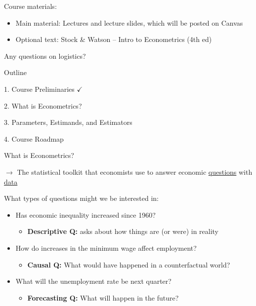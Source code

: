 \documentclass[11pt,english,handout]{beamer}
\begin{document}
\begin{frame}
	Course materials:
	
	\begin{itemize}
		\item Main material: Lectures and lecture slides, which will be posted on Canvas
		
		\item Optional text: Stock \& Watson -- Intro to Econometrics (4th ed)
\end{itemize}
\bigskip
Any questions on logistics? 

\end{frame}

\begin{frame}{Outline}

1. Course Preliminaries $\checkmark$
\vspace{0.8cm}

2. What is Econometrics?
\vspace{0.8cm}

3. Parameters, Estimands, and Estimators
\vspace{0.8cm}

4. Course Roadmap

\end{frame}

\begin{frame}{What is Econometrics?}

\vspace{0.2cm}
$\rightarrow$ The statistical toolkit that economists use to answer economic \uline{questions} with \uline{data}
\bigskip 

What types of questions might we be interested in: 
\pause
\medskip

\begin{itemize}
\item<1-> Has economic inequality increased since 1960?
	\begin{itemize}
		\item<3-> \textbf{Descriptive Q:} asks about how things are (or were) in reality
	\end{itemize}
\item<1-> How do increases in the minimum wage affect employment? 
	\begin{itemize}
		\item<4-> \textbf{Causal Q:} What would have happened in a counterfactual world?  
	\end{itemize}
\item<1->   What will the unemployment rate be next quarter?
	\begin{itemize}
	\item<5-> \textbf{Forecasting Q:} What will happen in the future?  
\end{itemize}

\end{itemize}
\medskip

\pause 
{}

\end{frame}
\end{document}
